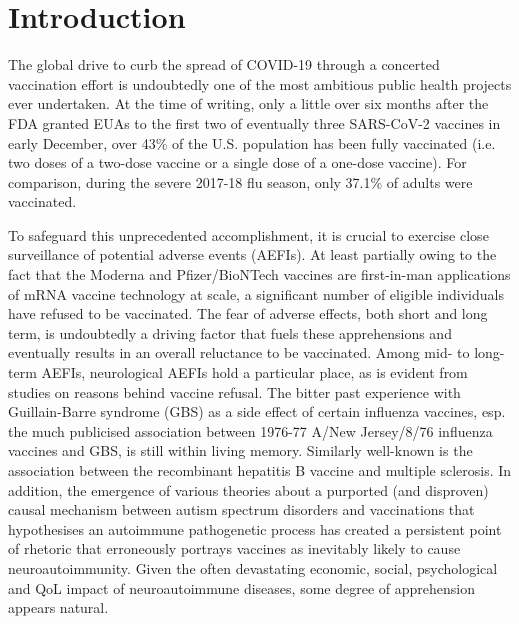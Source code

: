 \documentclass[idr,communication,submit,oneauthor,pdftex]{Definitions/mdpi}
\begin{document}

\section{Introduction}

The global drive to curb the spread of COVID-19 through a concerted vaccination effort is undoubtedly one of the most
ambitious public health projects ever undertaken. At the time of writing, only a little over six months after the FDA
granted EUAs to the first two of eventually three SARS-CoV-2 vaccines in early December, over 43\% of the U.S.
population has been fully vaccinated (i.e. two doses of a two-dose vaccine or a single dose of a one-dose vaccine). For
comparison, during the severe 2017-18 flu season, only 37.1\% of adults were vaccinated.\cite{centers2018estimates}

To safeguard this unprecedented accomplishment, it is crucial to exercise close surveillance of potential adverse
events (AEFIs). At least partially owing to the fact that the Moderna and Pfizer/BioNTech vaccines are first-in-man
applications of mRNA vaccine technology at scale, a significant number of eligible individuals have refused to be
vaccinated.\cite{dror2020vaccine,robertson2021predictors,troiano2021vaccine} The fear of adverse effects, both short and
long term, is undoubtedly a driving factor that fuels these apprehensions and eventually results in an overall
reluctance to be vaccinated. Among mid- to long-term AEFIs, neurological AEFIs hold a particular place, as is evident
from studies on reasons behind vaccine refusal.\cite{berry2021lessons} The bitter past experience with Guillain-Barre
syndrome (GBS) as a side effect of certain influenza vaccines, esp. the much publicised association between 1976-77
A/New Jersey/8/76 influenza vaccines and GBS, is still within living memory.\cite{haber2004guillain} Similarly
well-known is the association between the recombinant hepatitis B vaccine and multiple
sclerosis.\cite{hernan2004recombinant} In addition, the  emergence of various theories about a purported (and
disproven) causal mechanism between autism spectrum disorders and vaccinations that hypothesises an autoimmune
pathogenetic process has created a persistent point of rhetoric that erroneously portrays vaccines as inevitably
likely to cause neuroautoimmunity.\cite{poland2001understanding} Given the often devastating economic, social,
psychological and QoL impact of neuroautoimmune diseases,\cite{marck2020predictors,miller2006health,patwardhan2005cost}
some degree of apprehension appears natural.
\end{document}
